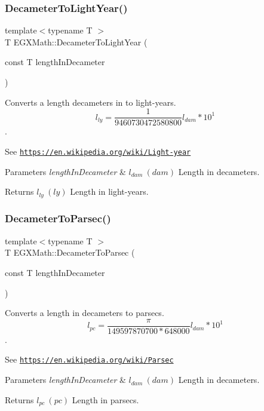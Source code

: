 \subsubsection{\texorpdfstring{Decameter\+To\+Light\+Year()}{DecameterToLightYear()}}
{\footnotesize\ttfamily template$<$typename T $>$ \\
T E\+G\+X\+Math\+::\+Decameter\+To\+Light\+Year (\begin{DoxyParamCaption}\item[{const T}]{length\+In\+Decameter }\end{DoxyParamCaption})}



Converts a length decameters in to light-\/years. \[ l_{ly}= \frac{1}{9460730472580800} l_{dam} * 10^{1} \]. 

See \href{https://en.wikipedia.org/wiki/Light-year}{\tt https\+://en.\+wikipedia.\+org/wiki/\+Light-\/year} 
\begin{DoxyParams}{Parameters}
{\em length\+In\+Decameter} & $ l_{dam}\ (dam)$ Length in decameters. \\
\hline
\end{DoxyParams}
\begin{DoxyReturn}{Returns}
$ l_{ly}\ (ly)$ Length in light-\/years. 
\end{DoxyReturn}
\mbox{\label{group___e_g_x_math-_conversions-_length_conversions-_s_i-_decameter-_astronomical_ga50cf188f39f408c283b9a696ec44cee1}} 
\subsubsection{\texorpdfstring{Decameter\+To\+Parsec()}{DecameterToParsec()}}
{\footnotesize\ttfamily template$<$typename T $>$ \\
T E\+G\+X\+Math\+::\+Decameter\+To\+Parsec (\begin{DoxyParamCaption}\item[{const T}]{length\+In\+Decameter }\end{DoxyParamCaption})}



Converts a length in decameters to parsecs. \[ l_{pc}=\frac{\pi}{149597870700 * 648000} l_{dam} * 10^{1} \]. 

See \href{https://en.wikipedia.org/wiki/Parsec}{\tt https\+://en.\+wikipedia.\+org/wiki/\+Parsec} 
\begin{DoxyParams}{Parameters}
{\em length\+In\+Decameter} & $ l_{dam}\ (dam)$ Length in decameters. \\
\hline
\end{DoxyParams}
\begin{DoxyReturn}{Returns}
$ l_{pc}\ (pc)$ Length in parsecs. 
\end{DoxyReturn}
